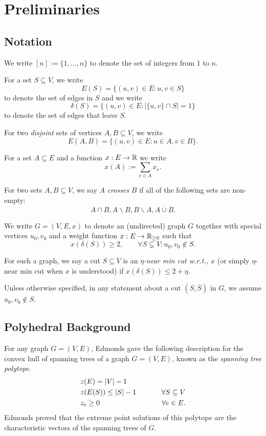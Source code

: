 
\section{Preliminaries}
\subsection{Notation}
We write $[n]:=\{1,\dots,n\}$ to denote the set of integers from $1$ to $n$.

For a set $S\subseteq V$, we write 
$$E(S)=\{(u,v)\in E: u,v\in S\}$$ to denote the set of edges in $S$ and we write 
$$\delta(S)=\{(u,v)\in E: |\{u,v\}\cap S|=1\}$$ 
to denote the  set of edges that leave $S$. 

For two {\em disjoint} sets of vertices $A,B\subseteq V$, we write
$$ E(A,B)=\{(u,v)\in E: u\in A, v\in B\}.$$

For a set $A\subseteq E$ and a function $x:E\to\mathbb{R}$ we write
$$ x(A):=\sum_{e\in A} x_e.$$

\hypertarget{tar:crossing}{For two sets $A,B\subseteq V$, we say $A$ {\em crosses} $B$ if all of the following sets are non-empty:
$$ A\cap B, A\smallsetminus B, B\smallsetminus A, \overline{A\cup B}.$$}

\hypertarget{tar:G=(V,E,x)}{We write $G=(V,E,x)$ to denote an (undirected) graph $G$ together with special vertices $u_0,v_0$ and a weight function $x:E\to\mathbb{R}_{\geq 0}$ such that 
$$x(\delta(S))\geq 2, \quad\quad \forall S\subsetneq V: u_0,v_0\notin S.$$}
\hypertarget{tar:nearmincut}{For such a graph, we say a cut $S\subseteq V$ is an {\em $\eta$-near min cut w.r.t., $x$} (or simply $\eta$-near min cut when $x$ is understood) if $x(\delta(S))\leq 2+\eta$.}
Unless otherwise specified, in any statement about a cut $(S,\overline{S})$ in $G$,  we assume $u_0,v_0\not\in S$. 

\subsection{Polyhedral Background}
For any graph $G=(V,E)$,
Edmonds \cite{Edm70} gave the following description for the convex hull of spanning trees of a graph $G=(V,E)$, known as the {\em spanning tree polytope}.
\begin{equation}
\begin{aligned}
& z(E) = |V|-1 & \\
& z(E(S)) \leq |S|-1 &  \forall S\subseteq V\\
& z_e \geq 0 & \hspace{6ex} \forall e\in E.
\end{aligned}
\label{eq:spanningtreelp}
\end{equation}
Edmonds \cite{Edm70} proved that the extreme point solutions of this polytope are the characteristic vectors of the spanning trees of $G$. 



